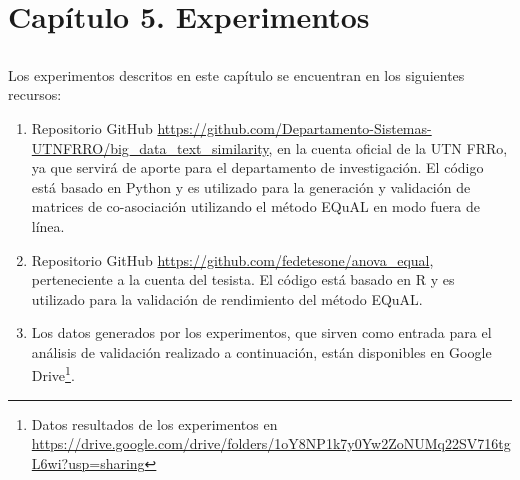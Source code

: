 \chapter*{Capítulo 5. \textbf{Experimentos}}\label{ch:experimentos}

\section*{}
\addtocounter{section}{1}
\setcounter{subsection}{0}

Los experimentos descritos en este capítulo se encuentran en los siguientes recursos:
\begin{enumerate}
	\item Repositorio GitHub \url{https://github.com/Departamento-Sistemas-UTNFRRO/big_data_text_similarity}, en la cuenta oficial de la UTN FRRo, ya que servirá de aporte para el departamento de investigación. El código está basado en Python y es utilizado para la generación y validación de matrices de co-asociación utilizando el método EQuAL en modo fuera de línea.
	\item Repositorio GitHub \url{https://github.com/fedetesone/anova_equal}, perteneciente a la cuenta del tesista. El código está basado en R y es utilizado para la validación de rendimiento del método EQuAL.
	\item Los datos generados por los experimentos, que sirven como entrada para el análisis de validación realizado a continuación, están disponibles en Google Drive\footnote{Datos resultados de los experimentos en \url{https://drive.google.com/drive/folders/1oY8NP1k7y0Yw2ZoNUMq22SV716tgL6wi?usp=sharing}}.
\end{enumerate}






